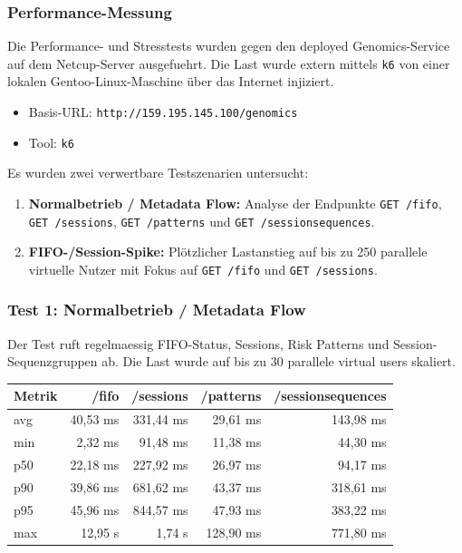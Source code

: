 \subsubsection{Performance-Messung}


Die Performance- und Stresstests wurden gegen den deployed Genomics-Service auf dem Netcup-Server ausgefuehrt. Die Last wurde extern mittels \texttt{k6} von einer lokalen Gentoo-Linux-Maschine über das Internet injiziert.

\begin{itemize}
    \item Basis-URL: \texttt{http://159.195.145.100/genomics}
    \item Tool: \texttt{k6}
\end{itemize}

Es wurden zwei verwertbare Testszenarien untersucht:

\begin{enumerate}
    \item \textbf{Normalbetrieb / Metadata Flow:} Analyse der Endpunkte \texttt{GET /fifo}, \texttt{GET /sessions}, \texttt{GET /patterns} und \texttt{GET /sessionsequences}.
    \item \textbf{FIFO-/Session-Spike:} Plötzlicher Lastanstieg auf bis zu 250 parallele virtuelle Nutzer mit Fokus auf \texttt{GET /fifo} und \texttt{GET /sessions}.
\end{enumerate}


\subsubsection{Test 1: Normalbetrieb / Metadata Flow}
Der Test ruft regelmaessig FIFO-Status, Sessions, Risk Patterns und Session-Sequenzgruppen ab. Die Last wurde auf bis zu 30 parallele virtual users skaliert.

\begin{table}[h]
\centering
\begin{tabular}{|l|r|r|r|r|}
\hline
\textbf{Metrik} & \textbf{/fifo} & \textbf{/sessions} & \textbf{/patterns} & \textbf{/sessionsequences} \\
\hline
avg & 40,53 ms & 331,44 ms & 29,61 ms & 143,98 ms \\
\hline
min & 2,32 ms & 91,48 ms & 11,38 ms & 44,30 ms \\
\hline
p50 & 22,18 ms & 227,92 ms & 26,97 ms & 94,17 ms \\
\hline
p90 & 39,86 ms & 681,62 ms & 43,37 ms & 318,61 ms \\
\hline
p95 & 45,96 ms & 844,57 ms & 47,93 ms & 383,22 ms \\
\hline
max & 12,95 s & 1,74 s & 128,90 ms & 771,80 ms \\
\hline
\end{tabular}
\end{table}

